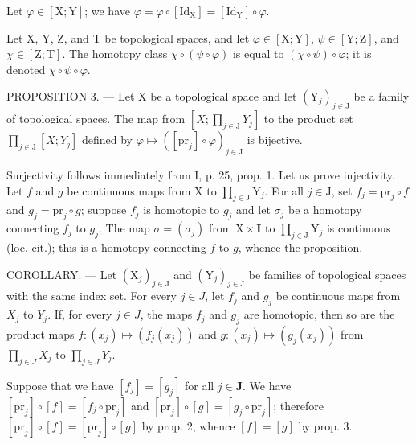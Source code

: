 Let \(\varphi\in[\mathrm{X};\mathrm{Y}]\); we have \(\varphi=\varphi\circ[\mathrm{Id}_{\mathrm{X}}]=[\mathrm{Id}_{\mathrm{Y}}]\circ\varphi\).

Let X, Y, Z, and T be topological spaces, and let \(\varphi \in [\mathrm{X};\mathrm{Y}]\), \(\psi \in [\mathrm{Y};\mathrm{Z}]\), and \(\chi \in [\mathrm{Z};\mathrm{T}]\). The homotopy class \(\chi \circ (\psi \circ \varphi)\) is equal to \((\chi \circ \psi) \circ \varphi\); it is denoted \(\chi \circ \psi \circ \varphi\).

PROPOSITION 3. --- Let X be a topological space and let \((\mathrm{Y}_{j})_{j\in\mathrm{J}}\) be a family of topological spaces. The map from \([X;\prod_{j\in\mathrm{J}}Y_{j}]\) to the product set \(\prod_{j\in\mathrm{J}}[X;Y_{j}]\) defined by \(\varphi\mapsto([\mathrm{pr}_{j}]\circ\varphi)_{j\in\mathrm{J}}\) is bijective.

Surjectivity follows immediately from I, p. 25, prop. 1. Let us prove injectivity. Let \(f\) and \(g\) be continuous maps from X to \(\prod_{j \in \mathrm{J}} \mathrm{Y}_j\). For all \(j \in \mathrm{J}\), set \(f_j = \mathrm{pr}_j \circ f\) and \(g_j = \mathrm{pr}_j \circ g\); suppose \(f_j\) is homotopic to \(g_j\) and let \(\sigma_j\) be a homotopy connecting \(f_j\) to \(g_j\). The map \(\sigma = (\sigma_j)\) from \(\mathrm{X} \times \mathbf{I}\) to \(\prod_{j \in \mathrm{J}} \mathrm{Y}_j\) is continuous (loc. cit.); this is a homotopy connecting \(f\) to \(g\), whence the proposition.

COROLLARY. --- Let \((\mathrm{X}_{j})_{j\in\mathrm{J}}\) and \((\mathrm{Y}_{j})_{j\in\mathrm{J}}\) be families of topological spaces with the same index set. For every \(j\in J\), let \(f_{j}\) and \(g_{j}\) be continuous maps from \(X_{j}\) to \(Y_{j}\). If, for every \(j\in J\), the maps \(f_{j}\) and \(g_{j}\) are homotopic, then so are the product maps \(f\colon(x_{j})\mapsto(f_{j}(x_{j}))\) and \(g\colon(x_{j})\mapsto(g_{j}(x_{j}))\) from \(\prod_{j\in J}X_{j}\) to \(\prod_{j\in J}Y_{j}\).

Suppose that we have \([f_j] = [g_j]\) for all \(j \in \mathbf{J}\). We have \([\mathrm{pr}_j] \circ [f] = [f_j \circ \mathrm{pr}_j]\) and \([\mathrm{pr}_j] \circ [g] = [g_j \circ \mathrm{pr}_j]\); therefore \([\mathrm{pr}_j] \circ [f] = [\mathrm{pr}_j] \circ [g]\) by prop. 2, whence \([f] = [g]\) by prop. 3.

